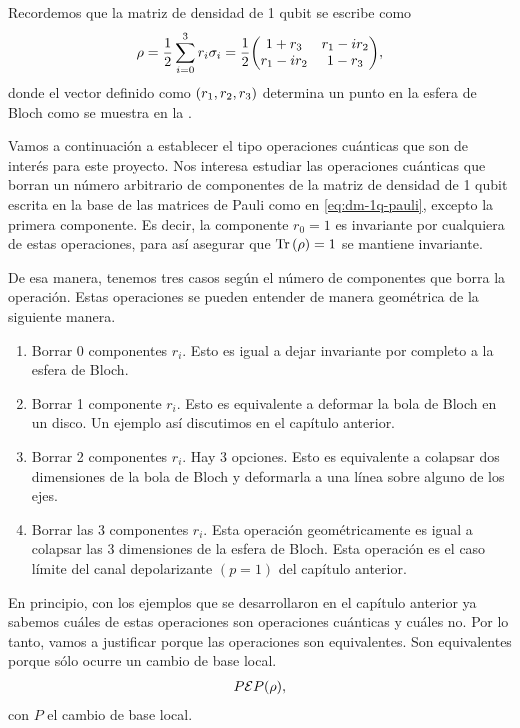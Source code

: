 
Recordemos que la matriz de densidad de 1 qubit se escribe como
\begin{align}
\rho = \frac{1}{2}\sum_{i=0}^3r_i\sigma_i
=\frac{1}{2}\mqty(1+r_3 & r_1-ir_2\\
r_1-ir_2 & 1-r_3),
\label{eq:dm-1q-pauli}
\end{align}
donde el vector definido como $\qty(r_1,r_2,r_3)$ 
determina un punto en la esfera de Bloch como se 
muestra en la \Fref{}. 

Vamos a continuación a establecer el tipo operaciones cuánticas
que son de interés para este proyecto. Nos interesa estudiar 
las operaciones cuánticas que borran un número arbitrario 
de componentes de la matriz de densidad de 1 qubit 
escrita en la base de las matrices de Pauli 
como en \eqref{eq:dm-1q-pauli}, excepto la primera 
componente. Es decir, la componente $r_0=1$ es invariante 
por cualquiera de estas operaciones, para así asegurar que 
$\Tr\qty(\rho)=1$ se mantiene invariante.

De esa manera, tenemos tres casos según el número de componentes
que borra la operación. Estas operaciones se pueden entender 
de manera geométrica de la siguiente manera. 
\begin{enumerate}
\item Borrar 0 componentes $r_i$. Esto es igual a dejar invariante 
por completo a la esfera de Bloch. 
\item Borrar 1 componente $r_i$. Esto es equivalente a deformar la bola 
de Bloch en un disco. Un ejemplo así discutimos en el capítulo 
anterior. 
\item Borrar 2 componentes $r_i$. Hay 3 opciones. Esto es equivalente
a colapsar dos dimensiones de la bola de Bloch y deformarla a
una línea sobre alguno de los ejes. 
\item Borrar las 3 componentes $r_i$. Esta operación geométricamente 
es igual a colapsar las 3 dimensiones de la esfera de Bloch. 
Esta operación es el caso límite del canal depolarizante $(p=1)$
del capítulo anterior. 
\end{enumerate}
En principio, con los ejemplos que se desarrollaron en el capítulo 
anterior ya sabemos cuáles de estas operaciones son operaciones
cuánticas y cuáles no. Por lo tanto, vamos a justificar porque las 
operaciones son equivalentes. Son equivalentes porque 
sólo ocurre un cambio de base local. 
\begin{align}
P \mathcal{E} P\qty(\rho),
\end{align}
con $P$ el cambio de base local.

